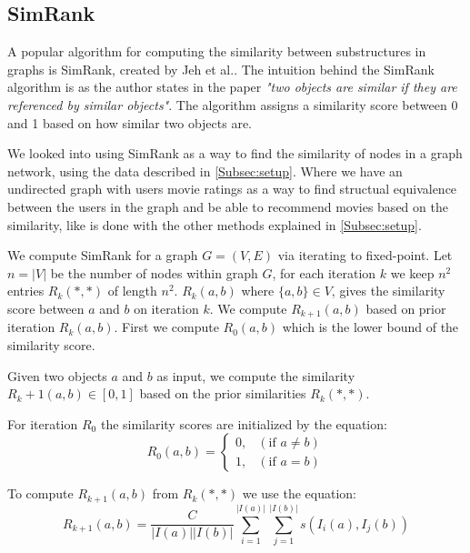 \subsection{SimRank}
\label{Subsec:SimRank}
A popular algorithm for computing the similarity between substructures in graphs is SimRank, created by Jeh et al.\cite{10.1145/775047.775126}.
The intuition behind the SimRank algorithm is as the author states in the paper \emph{"two objects are similar if they are referenced by similar objects"}\cite{10.1145/775047.775126}.
The algorithm assigns a similarity score between 0 and 1 based on how similar two objects are.

We looked into using SimRank as a way to find the similarity of nodes in a graph network, using the data described in \autoref{Subsec:setup}. Where we have an undirected graph with users movie ratings as a way to find structual equivalence between the users in the graph and be able to recommend movies based on the similarity, like is done with the other methods explained in \autoref{Subsec:setup}.

We compute SimRank for a graph $G = (V,E)$ via iterating to fixed-point.
Let $n = |V|$ be the number of nodes within graph $G$, for each iteration $k$ we keep $n^2$ entries $R_k(*,*)$ of length $n^2$.
$R_k(a,b)$ where $\{a,b\} \in V$, gives the similarity score between $a$ and $b$ on iteration $k$\cite{10.1145/775047.775126}.
We compute $R_{k+1}(a,b)$ based on prior iteration $R_k(a,b)$.
First we compute $R_0(a,b)$ which is the lower bound of the similarity score.

\begin{definition}[Simrank]\label{def:simrank} Given two objects $a$ and $b$ as input, we compute the similarity $R_k+1(a,b) \in [0,1]$ based on the prior similarities $R_k(*,*)$.

For iteration $R_0$ the similarity scores are initialized by the equation:
\begin{equation}\label{eq:lowerbound_sim_score}
R_0(a,b)= \begin{cases}
0, & (\text{if } a \neq b) \\

1 ,& (\text{if } a = b)
\end{cases}
\end{equation}

To compute $R_{k+1}(a,b)$ from $R_k(*,*)$ we use the equation:
\begin{equation}\label{eq:simrank_computation}
R_{k+1}(a,b)= \frac{C}{|I(a)||I(b)|}\sum^{|I(a)|}_{i=1}\sum^{|I(b)|}_{j=1}s(I_i(a),I_j(b))
\end{equation}

\end{definition}

